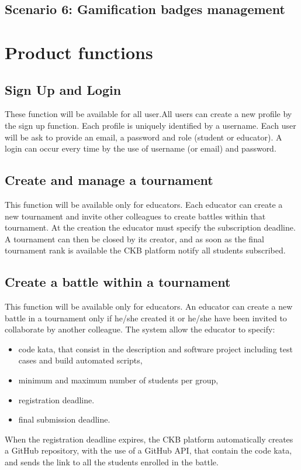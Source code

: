 \subsection{Scenario 6: Gamification badges management}

\clearpage

\section{Product functions}\label{desc:prodFunc}
\subsection{Sign Up and Login}
These function will be available for all user.\newline All users can create a new profile by the sign up function. Each profile is uniquely identified by a username. Each user will be ask to provide an email, a password and role (student or educator). \newline
A login can occur every time by the use of username (or email) and password.

\subsection{Create and manage a tournament}
This function will be available only for educators. \newline Each educator can create a new tournament and invite other colleagues to create battles within that tournament. At the creation the educator must specify the subscription deadline.
A tournament can then be closed by its creator, and as soon as the final tournament rank is available the CKB platform notify all students subscribed.

\subsection{Create a battle within a tournament}
This function will be available only for educators. \newline An educator can create a new battle in a tournament only if he/she created it or he/she have been invited to collaborate by another colleague.
The system allow the educator to specify: 
\begin{itemize}
    \item code kata, that consist in the description and software project including test cases and build automated scripts,
    \item minimum and maximum number of students per group, 
    \item registration deadline.
    \item final submission deadline.
\end{itemize}
When the registration deadline expires, the CKB platform automatically creates a GitHub repository, with the use of a GitHub API, that contain the code kata, and sends the link to all the students enrolled in the battle.

